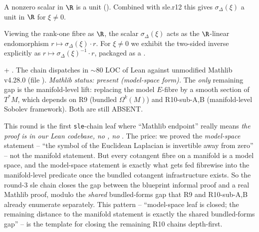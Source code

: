 \begin{lemma}
\label{lem:sle-r13}
A nonzero scalar in $\R$ is a unit
().  Combined with sle.r12 this gives
$\sigma_{\Delta}(\xi)$ a unit in $\R$ for $\xi \neq 0$.
\leanok\mathlibok
\end{lemma}

\begin{lemma}
\label{lem:sle-r14}
Viewing the rank-one fibre as $\R$, the scalar
$\sigma_{\Delta}(\xi)$ acts as the $\R$-linear endomorphism $r
\mapsto \sigma_{\Delta}(\xi)\cdot r$.  For $\xi \neq 0$ we exhibit
the two-sided inverse explicitly as $r \mapsto
\sigma_{\Delta}(\xi)^{-1}\cdot r$, packaged as a
.
\leanok
\end{lemma}

\begin{lemma}
\label{lem:sle-r15}
+ .
The chain dispatches in $\sim 80$ LOC of Lean against unmodified
Mathlib v4.28.0 (file
).
\emph{Mathlib status: present (model-space form).}  The \emph{only}
remaining gap is the manifold-level lift: replacing the model
$E$-fibre by a smooth section of $T^{*}M$, which depends on R9
(bundled $\Omega^{k}(M)$) and R10-sub-A,B (manifold-level Sobolev
framework).  Both are still ABSENT.
\leanok\mathlibok
\end{lemma}

\begin{layman}
This round is the first \texttt{sle}-chain leaf where ``Mathlib
endpoint'' really means \emph{the proof is in our Lean codebase, no
, no }.  The price: we proved the
\emph{model-space} statement -- ``the symbol of the Euclidean
Laplacian is invertible away from zero'' -- not the manifold
statement.  But every cotangent fibre on a manifold is a model
space, and the model-space statement is exactly what gets fed
fibrewise into the manifold-level  predicate once
the bundled cotangent infrastructure exists.  So the round-3 sle
chain closes the gap between the blueprint informal
proof and a real Mathlib proof, modulo the \emph{shared}
bundled-forms gap that R9 and R10-sub-A,B already enumerate
separately.  This pattern -- ``model-space leaf is closed; the
remaining distance to the manifold statement is exactly the
shared bundled-forms gap'' -- is the template for closing the
remaining R10 chains depth-first.
\end{layman}

